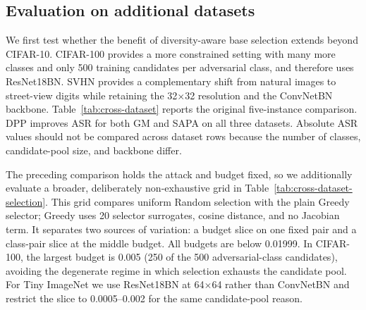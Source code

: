 \subsection{Evaluation on additional datasets}
We first test whether the benefit of diversity-aware base selection extends
beyond CIFAR-10. CIFAR-100 provides a more constrained setting with many more
classes and only 500 training candidates per adversarial class, and therefore
uses ResNet18BN. SVHN provides a complementary shift from natural images to
street-view digits while retaining the 32\(\times\)32 resolution and the
ConvNetBN backbone. Table~\ref{tab:cross-dataset} reports the original
five-instance comparison. DPP improves ASR for both GM and SAPA on all three
datasets. Absolute ASR values should not be compared across dataset rows because
the number of classes, candidate-pool size, and backbone differ.

\begin{table}[h]
\centering
\caption{Evaluation of Random and DPP base selection on CIFAR-10, CIFAR-100,
and SVHN. Results report ASR over five fixed attack instances with five victim
runs per target.}
\vspace{-0.5em}
\label{tab:cross-dataset}
\small
{}
\end{table}

The preceding comparison holds the attack and budget fixed, so we additionally
evaluate a broader, deliberately non-exhaustive grid in
Table~\ref{tab:cross-dataset-selection}. This grid compares uniform Random
selection with the plain Greedy selector; Greedy uses 20 selector surrogates,
cosine distance, and no Jacobian term. It separates two sources of variation: a
budget slice on one fixed pair and a class-pair slice at the middle budget. All
budgets are below 0.01999. In CIFAR-100, the largest budget is 0.005 (250 of the
500 adversarial-class candidates), avoiding the degenerate regime in which
selection exhausts the candidate pool. For Tiny ImageNet we use ResNet18BN at
64\(\times\)64 rather than ConvNetBN and restrict the slice to 0.0005--0.002 for
the same candidate-pool reason.

